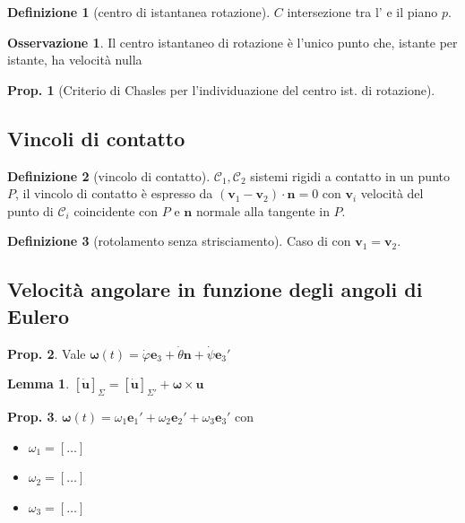 \documentclass[a4paper,10pt]{article}
\theoremstyle{definition}
\newcommand{\bv}{\boldsymbol} %
\theoremstyle{indentdefinition}
\newtheorem{defn}{Definizione}[section]
\theoremstyle{indenttheorem}
\newtheorem{prop}{Prop.}
\newtheorem{lem*}{Lemma}
\theoremstyle{myremark}
\newtheorem*{rem*}{Osservazione}
\theoremstyle{indentgeneral}
\begin{document}
\begin{defn}[centro di istantanea rotazione]
$C$ intersezione tra l' e il
piano $p$. 
\end{defn}

\begin{rem*}
    Il centro istantaneo di rotazione è l'unico punto che, istante per istante, ha velocità nulla
\end{rem*}

\begin{prop}[Criterio di Chasles per l'individuazione del centro ist. di rotazione]
    
\end{prop}





\subsection{Vincoli di contatto}
\begin{defn}[vincolo di contatto]
\label{def:vincolo-contatto}$\mathcal{C}_{1},\mathcal{C}_{2}$ sistemi
rigidi a contatto in un punto $P$, il vincolo di contatto è espresso
da $\left(\boldsymbol{v}_{1}-\boldsymbol{v}_{2}\right)\cdot\boldsymbol{n}=0$
con $\boldsymbol{v}_{i}$ velocità del punto di $\mathcal{C}_{i}$
coincidente con $P$ e $\boldsymbol{n}$ normale alla tangente in
$P$.
\end{defn}

\begin{defn}[rotolamento senza strisciamento]
Caso di  con $\boldsymbol{v}_{1}=\boldsymbol{v}_{2}$.
\end{defn}

\subsection{Velocità angolare in funzione degli angoli di Eulero}
\begin{prop}
    Vale $\bv{\omega}(t)=\dot{\varphi}\bv{e}_3+\dot{\theta}\bv{n}+\dot{\psi}\bv{e}_3'$
\end{prop}

\begin{lem*}
    $[\dot{\bv{u}}]_\Sigma=[\dot{\bv{u}}]_{\Sigma'}+\bv{\omega}\times\bv{u}$
\end{lem*}

\begin{prop}
    $\bv{\omega}(t)=\omega_1\bv{e}_1'+\omega_2\bv{e}_2'+\omega_3\bv{e}_3'$ con
    \begin{itemize}
        \item $\omega_1=[\dots]$
        \item $\omega_2=[\dots]$
        \item $\omega_3=[\dots]$
    \end{itemize}
\end{prop}
\end{document}
